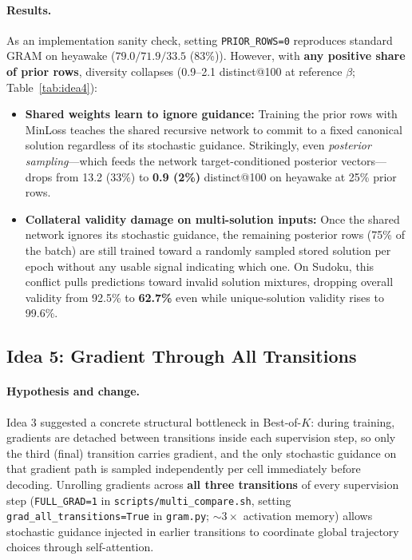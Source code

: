 \documentclass[11pt]{article}
\newcommand{\Bok}{Best-of-$K$}
\begin{document}
\paragraph{Results.}
As an implementation sanity check, setting \texttt{PRIOR\_ROWS=0} reproduces standard GRAM on heyawake ($79.0 / 71.9 / 33.5$ (83\%)). However, with \textbf{any positive share of prior rows}, diversity collapses (0.9--2.1 distinct@100 at reference $\beta$; Table~\ref{tab:idea4}):
\begin{itemize}
  \item \textbf{Shared weights learn to ignore guidance:} Training the prior rows with MinLoss teaches the shared recursive network to commit to a fixed canonical solution regardless of its stochastic guidance. Strikingly, even \emph{posterior sampling}---which feeds the network target-conditioned posterior vectors---drops from 13.2 (33\%) to \textbf{0.9 (2\%)} distinct@100 on heyawake at 25\% prior rows.
  \item \textbf{Collateral validity damage on multi-solution inputs:} Once the shared network ignores its stochastic guidance, the remaining posterior rows (75\% of the batch) are still trained toward a randomly sampled stored solution per epoch without any usable signal indicating which one. On Sudoku, this conflict pulls predictions toward invalid solution mixtures, dropping overall validity from 92.5\% to \textbf{62.7\%} even while unique-solution validity rises to 99.6\%.
\end{itemize}

\subsection{Idea 5: Gradient Through All Transitions}
\label{sec:idea5}

\paragraph{Hypothesis and change.}
{\sloppy Idea 3 suggested a concrete structural bottleneck in \Bok{}: during training, gradients are detached between transitions inside each supervision step, so only the third (final) transition carries gradient, and the only stochastic guidance on that gradient path is sampled independently per cell immediately before decoding. Unrolling gradients across \textbf{all three transitions} of every supervision step (\texttt{FULL\_GRAD=1} in \texttt{scripts/multi\_compare.sh}, setting \texttt{grad\_all\_transitions=True} in \texttt{gram.py}; $\sim 3\times$ activation memory) allows stochastic guidance injected in earlier transitions to coordinate global trajectory choices through self-attention.\par}
\end{document}
